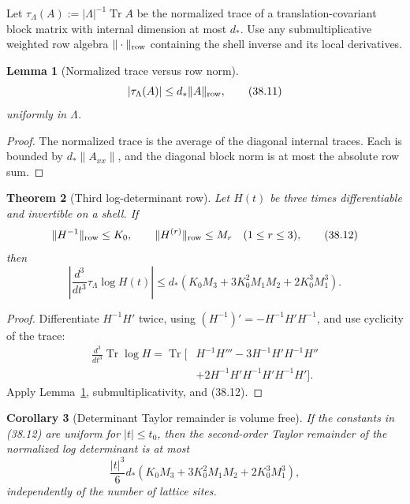 \documentclass[11pt,oneside]{book}
\newtheorem{theorem}{Theorem}[chapter]
\newtheorem{lemma}[theorem]{Lemma}
\newtheorem{corollary}[theorem]{Corollary}
\theoremstyle{definition}
\theoremstyle{remark}
\begin{document}
Let \(\tau_\Lambda(A):=|\Lambda|^{-1}\operatorname{Tr}A\) be the
normalized trace of a translation-covariant block matrix with
internal dimension at most \(d_*\).  Use any submultiplicative
weighted row algebra \(\|\cdot\|_{\rm row}\) containing the shell
inverse and its local derivatives.

\begin{lemma}[Normalized trace versus row norm]
\label{lem:e8v38-trace-row}
\[
                         |\tau_\Lambda(A)|
 \leq d_*\|A\|_{\rm row},                                        \tag{38.11}
\]
uniformly in \(\Lambda\).
\end{lemma}

\begin{proof}
The normalized trace is the average of the diagonal internal traces.
Each is bounded by \(d_*\|A_{xx}\|\), and the diagonal block norm is
at most the absolute row sum.
\end{proof}

\begin{theorem}[Third log-determinant row]
\label{thm:e8v38-logdet-third}
Let \(H(t)\) be three times differentiable and invertible on a shell.
If
\[
 \|H^{-1}\|_{\rm row}\leq K_0,\qquad
 \|H^{(r)}\|_{\rm row}\leq M_r\quad(1\leq r\leq3),                \tag{38.12}
\]
then
\[
\boxed{\qquad
 \left|
 \frac{d^3}{dt^3}\tau_\Lambda\log H(t)
 \right|
 \leq
 d_*\left(
 K_0M_3+3K_0^2M_1M_2+2K_0^3M_1^3
 \right).
\qquad}                                                         \tag{38.13}
\]
\end{theorem}

\begin{proof}
Differentiate \(H^{-1}H'\) twice, using
\((H^{-1})'=-H^{-1}H'H^{-1}\), and use cyclicity of the trace:
\[
\begin{split}
 \frac{d^3}{dt^3}\operatorname{Tr}\log H
 =
 \operatorname{Tr}\bigl[
 &H^{-1}H'''
 -3H^{-1}H'H^{-1}H''\\
 &+2H^{-1}H'H^{-1}H'H^{-1}H'
 \bigr].
\end{split}                                                       \tag{38.14}
\]
Apply Lemma~\ref{lem:e8v38-trace-row}, submultiplicativity, and
(38.12).
\end{proof}

\begin{corollary}[Determinant Taylor remainder is volume free]
\label{cor:e8v38-logdet-remainder}
If the constants in (38.12) are uniform for \(|t|\leq t_0\), then
the second-order Taylor remainder of the normalized log determinant
is at most
\[
 \frac{|t|^3}{6}d_*
 \left(K_0M_3+3K_0^2M_1M_2+2K_0^3M_1^3\right),                  \tag{38.15}
\]
independently of the number of lattice sites.
\end{corollary}
\end{document}
